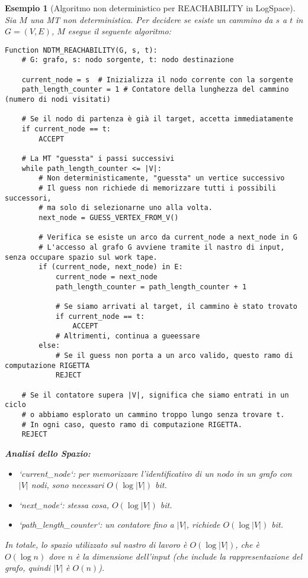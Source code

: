 \documentclass[a4paper]{article}
\newtheorem{example}{Esempio}[section]
\begin{document}
\begin{example}[Algoritmo non deterministico per REACHABILITY in LogSpace]
Sia $M$ una MT non deterministica. Per decidere se esiste un cammino da $s$ a $t$ in $G=(V,E)$, $M$ esegue il seguente algoritmo:

\begin{verbatim}
Function NDTM_REACHABILITY(G, s, t):
    # G: grafo, s: nodo sorgente, t: nodo destinazione
    
    current_node = s  # Inizializza il nodo corrente con la sorgente
    path_length_counter = 1 # Contatore della lunghezza del cammino (numero di nodi visitati)
    
    # Se il nodo di partenza è già il target, accetta immediatamente
    if current_node == t:
        ACCEPT
        
    # La MT "guessta" i passi successivi
    while path_length_counter <= |V|:
        # Non deterministicamente, "guessta" un vertice successivo
        # Il guess non richiede di memorizzare tutti i possibili successori,
        # ma solo di selezionarne uno alla volta.
        next_node = GUESS_VERTEX_FROM_V() 
        
        # Verifica se esiste un arco da current_node a next_node in G
        # L'accesso al grafo G avviene tramite il nastro di input, senza occupare spazio sul work tape.
        if (current_node, next_node) in E:
            current_node = next_node
            path_length_counter = path_length_counter + 1
            
            # Se siamo arrivati al target, il cammino è stato trovato
            if current_node == t:
                ACCEPT
            # Altrimenti, continua a gueessare
        else:
            # Se il guess non porta a un arco valido, questo ramo di computazione RIGETTA
            REJECT
    
    # Se il contatore supera |V|, significa che siamo entrati in un ciclo
    # o abbiamo esplorato un cammino troppo lungo senza trovare t.
    # In ogni caso, questo ramo di computazione RIGETTA.
    REJECT
\end{verbatim}

\textbf{Analisi dello Spazio:}
\begin{itemize}
    \item `current_node`: per memorizzare l'identificativo di un nodo in un grafo con $|V|$ nodi, sono necessari $O(\log |V|)$ bit.
    \item `next_node`: stessa cosa, $O(\log |V|)$ bit.
    \item `path_length_counter`: un contatore fino a $|V|$, richiede $O(\log |V|)$ bit.
\end{itemize}
In totale, lo spazio utilizzato sul nastro di lavoro è $O(\log |V|)$, che è $O(\log n)$ dove $n$ è la dimensione dell'input (che include la rappresentazione del grafo, quindi $|V|$ è $O(n)$).


\end{example}
\end{document}
